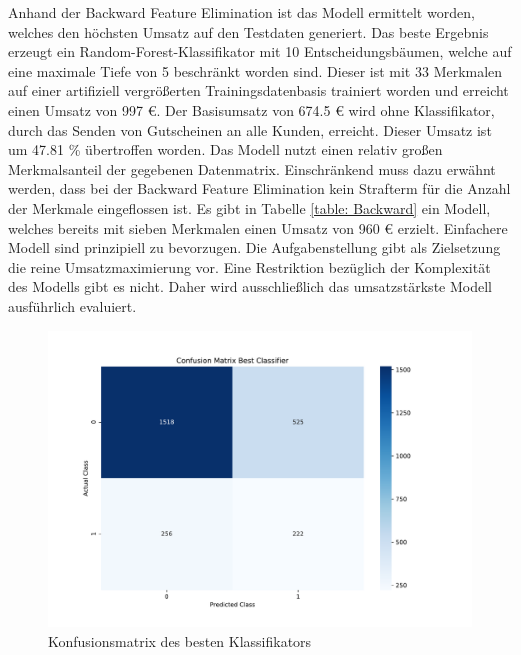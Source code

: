 Anhand der Backward Feature Elimination ist das Modell ermittelt worden, welches den höchsten Umsatz auf den Testdaten generiert. Das beste Ergebnis erzeugt ein Random-Forest-Klassifikator mit 10 Entscheidungsbäumen, welche auf eine maximale Tiefe von 5 beschränkt worden sind. Dieser ist mit 33 Merkmalen auf einer artifiziell vergrößerten Trainingsdatenbasis trainiert worden und erreicht einen Umsatz von 997 \euro{}. Der Basisumsatz von 674.5 \euro{} wird ohne Klassifikator, durch das Senden von Gutscheinen an alle Kunden, erreicht. Dieser Umsatz ist um 47.81 \% übertroffen worden. Das Modell nutzt einen relativ großen Merkmalsanteil der gegebenen Datenmatrix. Einschränkend muss dazu erwähnt werden, dass bei der Backward Feature Elimination kein Strafterm für die Anzahl der Merkmale eingeflossen ist. Es gibt in Tabelle \ref{table: Backward} ein Modell, welches bereits mit sieben Merkmalen einen Umsatz von 960 \euro{} erzielt. Einfachere Modell sind prinzipiell zu bevorzugen. Die Aufgabenstellung gibt als Zielsetzung die reine Umsatzmaximierung vor. Eine Restriktion bezüglich der Komplexität des Modells gibt es nicht. Daher wird ausschließlich das umsatzstärkste Modell ausführlich evaluiert.\\

\FloatBarrier
\begin{figure}[!htbp]
\begin{center}
\includegraphics[scale=0.5]{pdf/ConfbestClassifier.pdf}
\end{center}
\caption{Konfusionsmatrix des besten Klassifikators}
\label{fig:confusionFinal}
\end{figure}
\FloatBarrier

